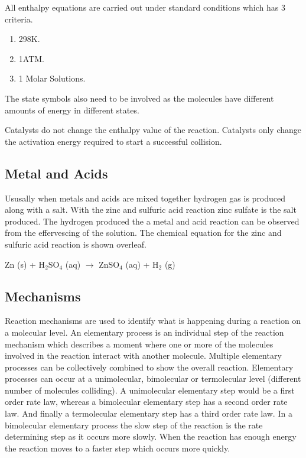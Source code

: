 All enthalpy equations are carried out under standard conditions which has 3 criteria.

\begin{enumerate}
\item 298K.
\item 1ATM.
\item 1 Molar Solutions.
\end{enumerate}

The state symbols also need to be involved as the molecules have different amounts of energy in different states. 

Catalysts do not change the enthalpy value of the reaction. Catalysts only change the activation energy required to start a successful collision.




	
	


	\subsection{Metal and Acids}

Ususally when metals and acids are mixed together hydrogen gas is produced along with a salt. With the zinc and sulfuric acid reaction zinc sulfate is the salt produced. The hydrogen produced the a metal and acid reaction can be observed from the effervescing of the solution. The chemical equation for the zinc and sulfuric acid reaction is shown overleaf.

Zn (s) + H$_2$SO$_4$ (aq) $\rightarrow$ ZnSO$_4$ (aq) + H$_2$ (g)




	\subsection{Mechanisms} \label{mechanism}

Reaction mechanisms are used to identify what is happening during a reaction on a molecular level. An elementary process is an individual step of the reaction mechanism which describes a moment where one or more of the molecules involved in the reaction interact with another molecule. Multiple elementary processes can be collectively combined to show the overall reaction. Elementary processes can occur at a unimolecular, bimolecular or termolecular level (different number of molecules colliding). A unimolecular elementary step would be a first order rate law, whereas a bimolecular elementary step has a second order rate law. And finally a termolecular elementary step has a third order rate law. In a bimolecular elementary process the slow step of the reaction is the rate determining step as it occurs more slowly. When the reaction has enough energy the reaction moves to a faster step which occurs more quickly.

